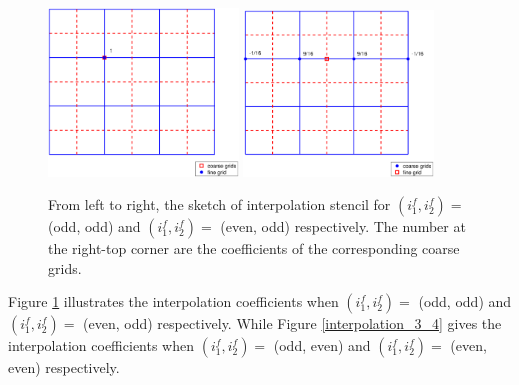 \documentclass[a4paper]{article}
\begin{document}
\begin{figure}[H]
	\centering
	\includegraphics[width=0.45\textwidth]{interpolation1.eps}
	\includegraphics[width=0.45\textwidth]{interpolation2.eps}
	\caption{\scriptsize{From left to right, the sketch of interpolation stencil for $(i_1^f,i_2^f) =$ (odd, odd) and $(i_1^f,i_2^f) =$ (even, odd) respectively. The number at the right-top corner are the coefficients of the corresponding coarse grids.}}\label{interpolation_1_2}
\end{figure}
Figure \ref{interpolation_1_2} illustrates the interpolation coefficients when $(i_1^f,i_2^f) = $ (odd, odd) and  $(i_1^f,i_2^f) = $ (even, odd) respectively. While Figure \ref{interpolation_3_4} gives the interpolation coefficients when $(i_1^f,i_2^f) = $ (odd, even) and  $(i_1^f,i_2^f) = $ (even, even) respectively.
\end{document}
